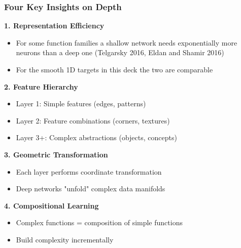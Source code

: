 \documentclass{beamer}
\begin{document}
\begin{frame}
\frametitle{Four Key Insights on Depth}

\textbf{1. Representation Efficiency}
\begin{itemize}
\item For some function families a shallow network needs exponentially more neurons than a deep one (Telgarsky 2016, Eldan and Shamir 2016)
\item For the smooth 1D targets in this deck the two are comparable
\end{itemize}

\textbf{2. Feature Hierarchy}
\begin{itemize}
\item Layer 1: Simple features (edges, patterns)
\item Layer 2: Feature combinations (corners, textures)
\item Layer 3+: Complex abstractions (objects, concepts)
\end{itemize}

\textbf{3. Geometric Transformation}
\begin{itemize}
\item Each layer performs coordinate transformation
\item Deep networks "unfold" complex data manifolds
\end{itemize}

\textbf{4. Compositional Learning}
\begin{itemize}
\item Complex functions = composition of simple functions
\item Build complexity incrementally
\end{itemize}

\end{frame}
\end{document}
